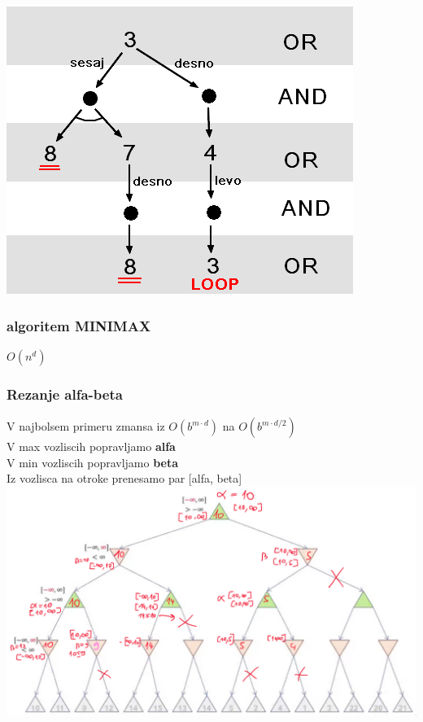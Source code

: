 \includegraphics[width=\columnwidth]{images/nedeterminizm_ao.png}

\subsubsection{algoritem MINIMAX}
$O(n^d)$
\subsubsection{Rezanje alfa-beta}
V najbolsem primeru zmansa iz $O(b^{m \cdot d})$ na $O(b^{m \cdot d/2})$\\
V max vozliscih popravljamo \textbf{alfa}\\
V min vozliscih popravljamo \textbf{beta}\\
Iz vozlisca na otroke prenesamo par [alfa, beta]\\
\includegraphics[width=\columnwidth]{images/alpha_beta_prunning.png}
